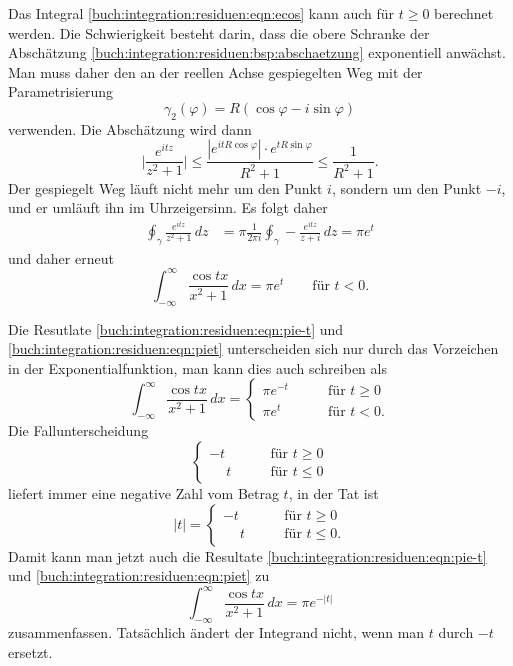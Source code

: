 Das Integral
\eqref{buch:integration:residuen:eqn:ecos}
kann auch für $t\ge 0$ berechnet werden.
Die Schwierigkeit besteht darin, dass die obere Schranke der Abschätzung
\eqref{buch:integration:residuen:bsp:abschaetzung}
exponentiell anwächst.
Man muss daher den an der reellen Achse gespiegelten Weg mit der
Parametrisierung
\[
\gamma_2(\varphi)
=
R(\cos\varphi - i\sin\varphi)
\]
verwenden.
Die Abschätzung wird dann
\[
\biggl|
\frac{e^{itz}}{z^2+1}
\biggr|
\le
\frac{|e^{itR\cos\varphi}|\cdot e^{tR\sin\varphi}}{R^2+1}
\le
\frac{1}{R^2+1}.
\]
Der gespiegelt Weg läuft nicht mehr um den Punkt $i$, sondern um den
Punkt $-i$, und er umläuft ihn im Uhrzeigersinn.
Es folgt daher
\begin{align*}
\oint_\gamma
\frac{e^{itz}}{z^2+1}
\,dz
&=
\pi
\frac{1}{2\pi i}
\oint_{\gamma}
-
\frac{e^{itz}}{z+i}
\,dz
=
\pi e^{t}
\end{align*}
und daher erneut
\begin{equation}
\int_{-\infty}^\infty
\frac{\cos tx}{x^2 + 1}
\,dx
=
\pi e^{t}
\qquad
\text{für $t<0$}.
\label{buch:integration:residuen:eqn:piet}
\end{equation}

Die Resutlate
\eqref{buch:integration:residuen:eqn:pie-t}
und
\eqref{buch:integration:residuen:eqn:piet}
unterscheiden sich nur durch das Vorzeichen in der Exponentialfunktion,
man kann dies auch schreiben als
\[
\int_{-\infty}^\infty
\frac{\cos tx}{x^2+1}
\,dx
=
\begin{cases}
\pi e^{-t}&\qquad \text{für $t \ge 0$}\\
\pi e^{t} &\qquad \text{für $t < 0$}.
\end{cases}
\]
Die Fallunterscheidung
\[
\begin{cases}
         - t&\qquad \text{für $t \ge 0$}\\
\phantom{-}t&\qquad \text{für $t \le 0$}
\end{cases}
\]
liefert immer eine negative Zahl vom Betrag $t$, in der Tat ist
\[
|t|
=
\begin{cases}
         - t&\qquad \text{für $t \ge 0$}\\
\phantom{-}t&\qquad \text{für $t \le 0$}.
\end{cases}
\]
Damit kann man jetzt auch die Resultate
\eqref{buch:integration:residuen:eqn:pie-t}
und
\eqref{buch:integration:residuen:eqn:piet}
zu
\begin{equation}
\int_{-\infty}^\infty
\frac{\cos tx}{x^2 + 1}
\,dx
=
\pi e^{-|t|}
\end{equation}
zusammenfassen.
Tatsächlich ändert der Integrand nicht, wenn man $t$ durch $-t$ ersetzt.

